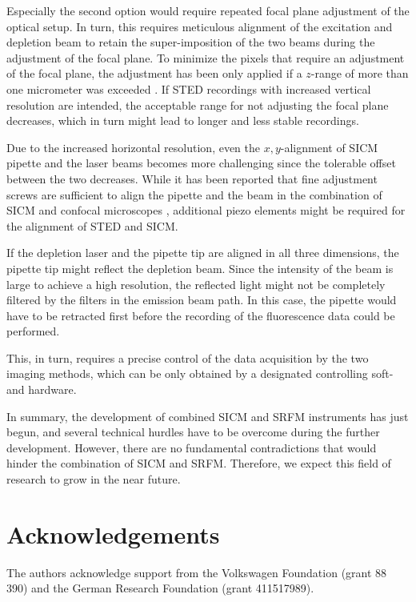 Especially the second option would require repeated
focal plane adjustment of the optical setup. In turn, this requires meticulous
alignment of the excitation and depletion beam to retain the super-imposition
of the two beams during the adjustment of the focal plane. To minimize the
pixels that require an adjustment of the focal plane, the adjustment has been
only applied if a $z$-range of more than one micrometer was exceeded
\cite{Novak2014}. If STED recordings with increased vertical resolution are
intended, the acceptable range for not adjusting the focal plane decreases,
which in turn might lead to longer and less stable recordings. 

Due to the increased horizontal resolution, even the $x,y$-alignment of SICM
pipette and the laser beams becomes more challenging since the tolerable
offset between the two decreases. While it has been reported that fine
adjustment screws are sufficient to align the pipette and the beam in the
combination of SICM and confocal microscopes \cite{Gorelik2002a,
  Shevchuk2008,Novak2014}, additional piezo elements might be required for the
alignment of STED and SICM.

If the depletion laser and the pipette tip are aligned in all three
dimensions, the pipette tip might reflect the depletion beam. Since the
intensity of the beam is large to achieve a high resolution, the reflected
light might not be completely filtered by the filters in the emission beam
path. In this case, the pipette would have to be retracted first before the
recording of the fluorescence data could be performed.

This, in turn, requires a precise control of the data acquisition by the two
imaging methods, which can be only obtained by a designated controlling soft-
and hardware.

In summary, the development of combined SICM and SRFM instruments has just
begun, and several technical hurdles have to be overcome during the
further development. However, there are no fundamental contradictions that
would hinder the combination of SICM and SRFM. Therefore, we expect this field
of research to grow in the near future.     

\section{Acknowledgements}
The authors acknowledge support from the Volkswagen
Foundation (grant 88 390) and the German Research Foundation (grant
411517989). 
